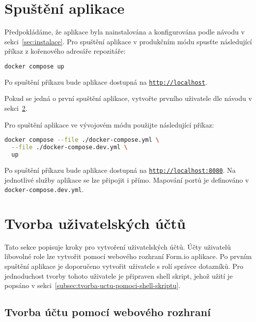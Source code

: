 \section{Spuštění aplikace}\label{sec:spusteni-aplikace}

Předpokládáme, že aplikace byla nainstalována a konfigurována podle návodu v sekci~\ref{sec:instalace}.
Pro spuštění aplikace v produkčním módu spusťte následující příkaz z kořenového adresáře repozitáře:

\begin{lstlisting}[language=bash]
docker compose up
\end{lstlisting}

Po spuštění příkazu bude aplikace dostupná na \href{http://localhost}{\lstinline{http://localhost}}.

Pokud se jedná o první spuštění aplikace, vytvořte prvního uživatele dle návodu v sekci~\ref{sec:tvorba-uzivatelskych-uctu}.

Pro spuštění aplikace ve vývojovém módu použijte následující příkaz:

\begin{lstlisting}[language=bash]
docker compose --file ./docker-compose.yml \
  --file ./docker-compose.dev.yml \
  up
\end{lstlisting}

Po spuštění příkazu bude aplikace dostupná na \href{http://localhost:8080}{\lstinline{http://localhost:8080}}.
Na jednotlivé služby aplikace se lze připojit i přímo.
Mapování portů je definováno v \lstinline{docker-compose.dev.yml}.


\section{Tvorba uživatelských účtů}\label{sec:tvorba-uzivatelskych-uctu}

Tato sekce popisuje kroky pro vytvoření uživatelských účtů.
Účty uživatelů libovolné role lze vytvořit pomocí webového rozhraní Form.io aplikace.
Po prvním spuštění aplikace je doporučeno vytvořit uživatele s rolí správce dotazníků.
Pro jednoduchost tvorby tohoto uživatele je připraven shell skript, jehož užití je popsáno v sekci~\ref{subsec:tvorba-uctu-pomoci-shell-skriptu}.

\subsection{Tvorba účtu pomocí webového rozhraní}\label{subsec:tvorba-uctu-pomoci-weboveho-rozhrani}

